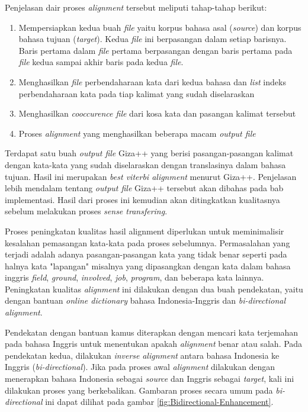 Penjelasan dair proses \textit{alignment} tersebut meliputi tahap-tahap berikut:
\begin{enumerate}
	\item Mempersiapkan kedua buah \textit{file} yaitu korpus bahasa asal (\textit{source}) dan korpus bahasa tujuan (\textit{target}). Kedua \textit{file} ini berpasangan dalam setiap barisnya. Baris pertama dalam \textit{file} pertama berpasangan dengan baris pertama pada \textit{file} kedua sampai akhir baris pada kedua \textit{file}.
	\item Menghasilkan \textit{file} perbendaharaan kata dari kedua bahasa dan \textit{list} indeks perbendaharaan kata pada tiap kalimat yang sudah diselaraskan
	\item Menghasilkan \textit{cooccurence file} dari kosa kata dan pasangan kalimat tersebut
	\item Proses \textit{alignment} yang menghasilkan beberapa macam \textit{output file} 
\end{enumerate}

Terdapat satu buah \textit{output file} Giza++ yang berisi pasangan-pasangan kalimat dengan kata-kata yang sudah diselaraskan dengan translasinya dalam bahasa tujuan. Hasil ini merupakan \textit{best viterbi alignment} menurut Giza++. Penjelasan lebih mendalam tentang \textit{output file} Giza++ tersebut akan dibahas pada bab implementasi. Hasil dari proses ini kemudian akan ditingkatkan kualitasnya sebelum melakukan proses \textit{sense transfering}.

Proses peningkatan kualitas hasil alignment diperlukan untuk meminimalisir kesalahan pemasangan kata-kata pada proses sebelumnya. Permasalahan  yang terjadi adalah adanya pasangan-pasangan kata yang tidak benar seperti pada halnya kata "lapangan" misalnya yang  dipasangkan dengan kata dalam bahasa inggris \textit{field}, \textit{ground}, \textit{involved}, \textit{job}, \textit{program}, dan beberapa kata lainnya. Peningkatan kualitas \textit{alignment} ini dilakukan dengan dua buah pendekatan, yaitu dengan bantuan \textit{online dictionary} bahasa Indonesia-Inggris dan \textit{bi-directional alignment}. 

Pendekatan dengan bantuan kamus diterapkan dengan mencari kata terjemahan pada bahasa Inggris untuk menentukan apakah \textit{alignment} benar atau salah. Pada pendekatan kedua, dilakukan \textit{inverse} \textit{alignment} antara bahasa Indonesia ke Inggris (\textit{bi-directional}). Jika pada proses awal \textit{alignment} dilakukan dengan menerapkan bahasa Indonesia sebagai \textit{source} dan Inggris sebagai \textit{target}, kali ini dilakukan proses yang berkebalikan. Gambaran proses secara umum pada \textit{bi-directional} ini dapat dilihat pada gambar \ref{fig:Bidirectional-Enhancement}.

